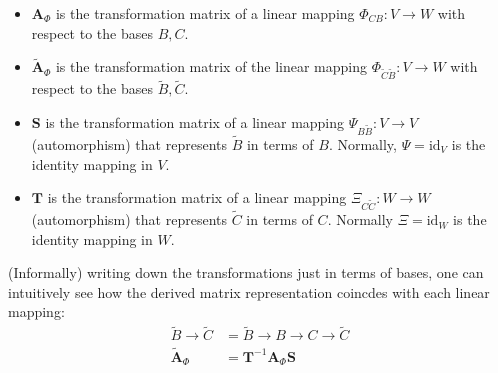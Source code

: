 \documentclass{report}
\begin{document}
\begin{itemize}
\item$\bm{A}_\Phi$ is the transformation matrix of a linear mapping $\Phi_{CB}:V\to W$ with respect
to the bases $B,C$.
\item$\tilde{\bm{A}}_\Phi$ is the transformation matrix of the linear mapping $\Phi_{\tilde{C}\tilde{B}}:V\to W$ with respect
to the bases $\tilde{B},\tilde{C}$.
\item$\bm{S}$ is the transformation matrix of a linear mapping $\Psi_{B\tilde{B}}:V\to V$ (automorphism)
that represents $\tilde{B}$ in terms of $B$. Normally,
$\Psi=\text{id}_V$ is the identity mapping in $V$.
\item$\bm{T}$ is the transformation matrix of a linear mapping $\Xi_{C\tilde{C}}:W\to W$ (automorphism)
that represents $\tilde{C}$ in terms of $C$. Normally
$\Xi=\text{id}_W$ is the identity mapping in $W$.
\end{itemize}
(Informally) writing down the transformations just in terms of bases, one can intuitively see how
the derived matrix representation coincdes with each linear mapping:
\begin{align*}
\tilde{B}\to\tilde{C}&=\tilde{B}\to B\to C\to\tilde{C}\\
\tilde{\bm{A}}_\Phi&=\bm{T}^{-1}\bm{A}_\Phi\bm{S}
\end{align*}
\newpage
\end{document}
